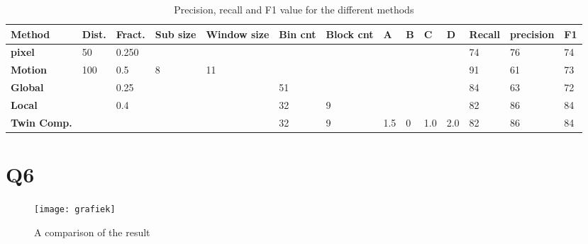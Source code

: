 \begin{appendices}
\begin{landscape}
\begin{table}[h]
\caption{Precision, recall and F1 value for the different methods}
\label{ROCValues}
\begin{tabular}{|l|l|l|l|l|l|l|l|l|l|l|l|l|l|}
\hline
\textbf{Method}          & \textbf{Dist.} & \textbf{Fract.} & \textbf{Sub size} & \textbf{Window size} & \textbf{Bin cnt} & \textbf{Block cnt} & \textbf{A} & \textbf{B} & \textbf{C} & \textbf{D} & \textbf{Recall} & \textbf{precision} & \textbf{F1} \\ \hline
\textbf{pixel}           & 50                & 0.250             &                   &                      &                    &                      &            &            &            &            & 74              & 76                 & 74          \\ \hline
\textbf{Motion}          & 100               & 0.5               & 8                 & 11                   &                    &                      &            &            &            &            & 91              & 61                 & 73          \\ \hline
\textbf{Global}          &                   & 0.25              &                   &                      & 51                 &                      &            &            &            &            & 84              & 63                 & 72          \\ \hline
\textbf{Local}           &                   & 0.4               &                   &                      & 32                 & 9                    &            &            &            &            & 82              & 86                 & 84          \\ \hline
\textbf{Twin Comp.} &                   &                   &                   &                      & 32                 & 9                    & 1.5        & 0          & 1.0        & 2.0        & 82              & 86                 & 84          \\ \hline
\end{tabular}
\end{table}
\end{landscape}


\newpage
\section{Q6}\label{app:q6}
\begin{figure}[ht]
  \centering
  \texttt{[image: grafiek]}
  \caption{A comparison of the result}
  \label{grafiek}
\end{figure}

\end{appendices}